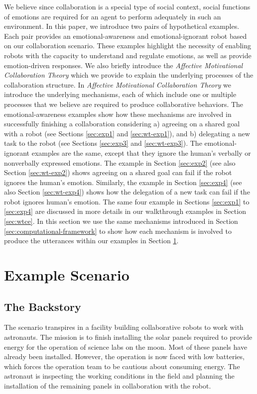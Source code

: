 We believe since collaboration is a special type of social context, social
functions of emotions are required for an agent to perform adequately in such an
environment. In this paper, we introduce two pairs of hypothetical examples.
Each pair provides an emotional-awareness and emotional-ignorant robot based on
our collaboration scenario. These examples highlight the necessity of enabling
robots with the capacity to understand and regulate emotions, as well as
provide emotion-driven responses. We also briefly introduce the
\textit{Affective Motivational Collaboration Theory} which we provide to
explain the underlying processes of the collaboration structure. In
\textit{Affective Motivational Collaboration Theory} we introduce the underlying
mechanisms, each of which include one or multiple processes that we believe are
required to produce collaborative behaviors. The emotional-awareness examples
show how these mechanisms are involved in successfully finishing a collaboration
considering a) agreeing on a shared goal with a robot (see Sections
\ref{sec:exp1} and \ref{sec:wt-exp1}), and b) delegating a new task to the robot
(see Sections \ref{sec:exp3} and \ref{sec:wt-exp3}). The emotional-ignorant
examples are the same, except that they ignore the human's verbally or
nonverbally expressed emotions. The example in Section \ref{sec:exp2} (see also
Section \ref{sec:wt-exp2}) shows agreeing on a shared goal can fail if the robot
ignores the human's emotion. Similarly, the example in Section \ref{sec:exp4}
(see also Section \ref{sec:wt-exp4}) shows how the delegation of a new task can
fail if the robot ignores human's emotion. The same four example in Sections
\ref{sec:exp1} to \ref{sec:exp4} are discussed in more details in our
walkthrough examples in Section \ref{sec:wtce}. In this section we use the same
mechanisms introduced in Section \ref{sec:computational-framework} to show how
each mechanism is involved to produce the utterances within our examples in
Section \ref{sec:example-scenario}.

\section{Example Scenario}
\label{sec:example-scenario}

\subsection{The Backstory}

The scenario transpires in a facility building collaborative robots to work with
astronauts. The mission is to finish installing the solar panels required to
provide energy for the operation of science labs on the moon. Most of these
panels have already been installed. However, the operation is now faced with low
batteries, which forces the operation team to be cautious about consuming
energy. The astronaut is inspecting the working conditions in the field and
planning the installation of the remaining panels in collaboration with the
robot.


